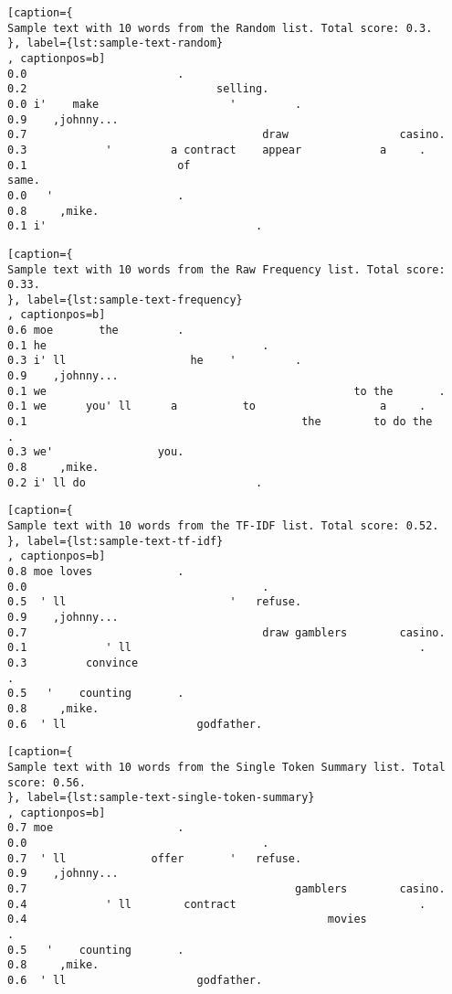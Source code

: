 
\begin{lstlisting}[caption={
Sample text with 10 words from the Random list. Total score: 0.3.
}, label={lst:sample-text-random}
, captionpos=b]
0.0	                      .
0.2	                            selling.
0.0	i'    make                    '         .
0.9	   ,johnny...
0.7	                                   draw                 casino.
0.3	           '         a contract    appear            a     .
0.1	                      of                                      same.
0.0	  '                   .
0.8	    ,mike.
0.1	i'                                .
\end{lstlisting}




\begin{lstlisting}[caption={
Sample text with 10 words from the Raw Frequency list. Total score: 0.33.
}, label={lst:sample-text-frequency}
, captionpos=b]
0.6	moe       the         .
0.1	he                                 .
0.3	i' ll                   he    '         .
0.9	   ,johnny...
0.1	we                                               to the       .
0.1	we      you' ll      a          to                   a     .
0.1	                                         the        to do the     .
0.3	we'                you.
0.8	    ,mike.
0.2	i' ll do                          .
\end{lstlisting}




\begin{lstlisting}[caption={
Sample text with 10 words from the TF-IDF list. Total score: 0.52.
}, label={lst:sample-text-tf-idf}
, captionpos=b]
0.8	moe loves             .
0.0	                                   .
0.5	 ' ll                         '   refuse.
0.9	   ,johnny...
0.7	                                   draw gamblers        casino.
0.1	           ' ll                                            .
0.3	        convince                                                  .
0.5	  '    counting       .
0.8	    ,mike.
0.6	 ' ll                    godfather.
\end{lstlisting}




\begin{lstlisting}[caption={
Sample text with 10 words from the Single Token Summary list. Total score: 0.56.
}, label={lst:sample-text-single-token-summary}
, captionpos=b]
0.7	moe                   .
0.0	                                   .
0.7	 ' ll             offer       '   refuse.
0.9	   ,johnny...
0.7	                                        gamblers        casino.
0.4	           ' ll        contract                            .
0.4	                                             movies               .
0.5	  '    counting       .
0.8	    ,mike.
0.6	 ' ll                    godfather.
\end{lstlisting}


